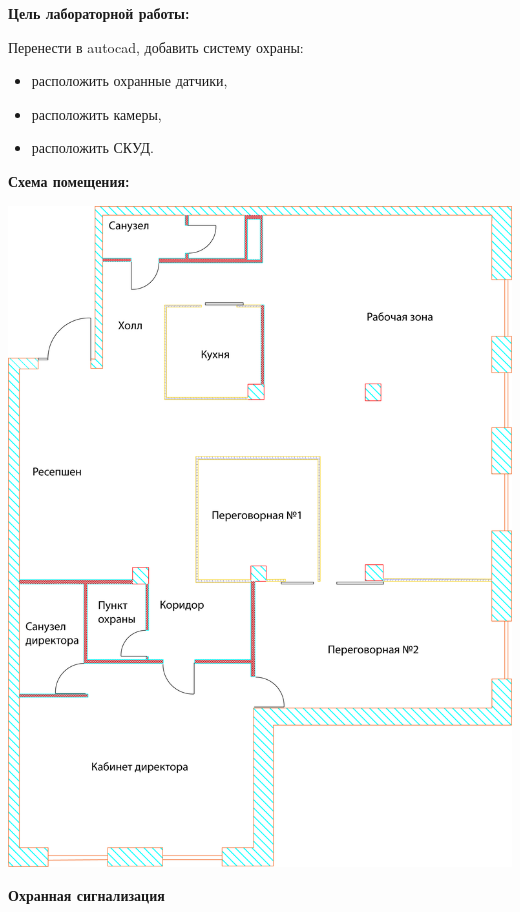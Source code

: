 \documentclass[a4paper,14pt]{extarticle}
\begin{document}
    \textbf{Цель лабораторной работы:}

    Перенести в autocad, добавить систему охраны:
    \vspace{-6ex}
    \begin{singlespace}
        \begin{itemize}
            \item расположить охранные датчики,
            \item расположить камеры, 
            \item расположить СКУД.
        \end{itemize} 
    \end{singlespace}

    \textbf{Схема помещения:}
    \begin{center}
        \includegraphics[scale=0.6, angle=90]{pics/scheme.png}
    \end{center}

    \newpage
    \textbf{\large{Охранная сигнализация}}
\end{document}
